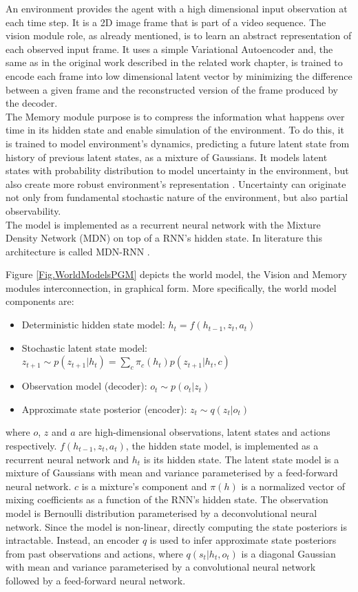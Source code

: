 An environment provides the agent with a high dimensional input observation at each time step. It is a 2D image frame that is part of a video sequence. The vision module role, as already mentioned, is to learn an abstract representation of each observed input frame. It uses a simple Variational Autoencoder \cite{Algo.VAE} and, the same as in the original work described in the related work chapter, is trained to encode each frame into low dimensional latent vector by minimizing the difference between a given frame and the reconstructed version of the frame produced by the decoder. \\
The Memory module purpose is to compress the information what happens over time in its hidden state and enable simulation of the environment. To do this, it is trained to model environment's dynamics, predicting a future latent state from history of previous latent states, as a mixture of Gaussians. It models latent states with probability distribution to model uncertainty in the environment, but also create more robust environment's representation \cite{Algo.FastGenerativeModels}. Uncertainty can originate not only from fundamental stochastic nature of the environment, but also partial observability. \\
The model is implemented as a recurrent neural network with the Mixture Density Network (MDN) on top of a RNN's hidden state. In literature this architecture is called MDN-RNN \cite{Algo.MDNRNN}.

Figure \ref{Fig.WorldModelsPGM} depicts the world model, the Vision and Memory modules interconnection, in graphical form. More specifically, the world model components are:
\begin{itemize}
\item Deterministic hidden state model:      $h_t = f(h_{t-1}, z_{t}, a_{t})$
\item Stochastic latent state model:         $z_{t+1} \sim p(z_{t+1}|h_t) = \sum_c\pi_c(h_t)p(z_{t+1}|h_t, c)$
\item Observation model (decoder):           $o_t \sim p(o_t|z_t)$
\item Approximate state posterior (encoder): $z_t \sim q(z_t|o_t)$
\end{itemize}
where $o$, $z$ and $a$ are high-dimensional observations, latent states and actions respectively. $f(h_{t-1}, z_{t}, a_{t})$, the hidden state model, is implemented as a recurrent neural network and $h_t$ is its hidden state. The latent state model is a mixture of Gaussians with mean and variance parameterised by a feed-forward neural network. $c$ is a mixture's component and $\pi(h)$ is a normalized vector of mixing coefficients as a function of the RNN's hidden state. The observation model is Bernoulli distribution parameterised by a deconvolutional neural network. Since the model is non-linear, directly computing the state posteriors is intractable. Instead, an encoder $q$ is used to infer approximate state posteriors from past observations and actions, where $q(s_t | h_t, o_t)$ is a diagonal Gaussian with mean and variance parameterised by a convolutional neural network followed by a feed-forward neural network.

